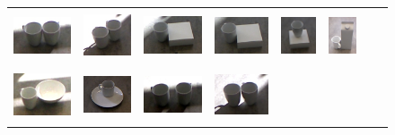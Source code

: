 \begin{figure}[h!]
\begin{tabular}{cccccccc}
    \includegraphics[height=1.5cm]{pictures/121.jpg}&
    \includegraphics[height=1.5cm]{pictures/131.jpg}&
    \includegraphics[height=1.5cm]{pictures/141.jpg}&
    \includegraphics[height=1.5cm]{pictures/151.jpg}&
    \includegraphics[height=1.5cm]{pictures/161.jpg}&
    \includegraphics[height=1.5cm]{pictures/171.jpg}\\ \includegraphics[height=1.5cm]{pictures/102.jpg}&
    \includegraphics[height=1.5cm]{pictures/112.jpg}&
    \includegraphics[height=1.5cm]{pictures/122.jpg}&
    \includegraphics[height=1.5cm]{pictures/132.jpg}&

\end{tabular}
\end{figure}
